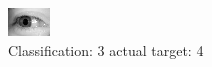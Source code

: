 \begin{figure}[h!]
\begin{center}
\includegraphics[width=0.60\columnwidth]{figures/ID3180_class_3_target_4.png}
\end{center}
\caption{ Classification: 3 actual target: 4}
\label{fig:ID3180_class_3_target_4}
\end{figure}
